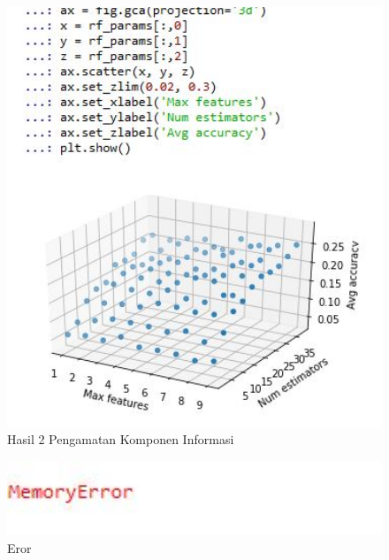 \begin{figure}[ht]
	\centerline{\includegraphics[width=1\textwidth]{figures/huda/chapter3_praktek/33.JPG}}
	\caption{Hasil 2 Pengamatan Komponen Informasi}
	\label{h37}
\end{figure}

\begin{figure}[ht]
	\centerline{\includegraphics[width=1\textwidth]{figures/huda/chapter3_praktek/eror.JPG}}
	\caption{Eror}
	\label{h38}
\end{figure}